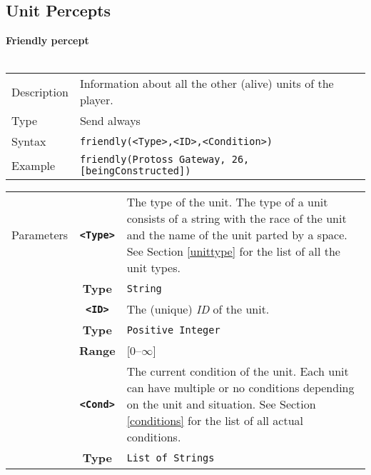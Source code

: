 \subsection{Unit Percepts}
\noindent
\textbf{Friendly percept}\\
\\
\begin{tabularx}{\textwidth}{lX}
 Description & Information about all the other (alive) units of the player. \\
 Type & Send always \\
 Syntax & \verb|friendly(<Type>,<ID>,<Condition>)| \\
 Example & \verb|friendly(Protoss Gateway, 26, [beingConstructed])| \\
 \end{tabularx}
 \begin{tabularx}{\textwidth}{l | c | p{8cm}|}
 \cline{2-3}
 Parameters
            & \textbf{\verb|<Type>|} & The type of the unit. The type of a unit consists of a string with the race of the unit and the name of the unit parted by a space. See Section \ref{unittype} for the list of all the unit types. \\
            & \textbf{Type} & \verb|String| \\
            \cline{2-3}
            & \textbf{\verb|<ID>|} & The (unique) \textit{ID} of the unit.\\
            & \textbf{Type} & \verb|Positive Integer| \\
            & \textbf{Range} & [0--$\infty$] \\
            \cline{2-3}
            & \textbf{\verb|<Cond>|} & The current condition of the unit. Each unit can have multiple or no conditions depending on the unit and situation. See Section \ref{conditions} for the list of all actual conditions.\\
            & \textbf{Type} & \verb|List of Strings| \\
            \cline{2-3}
\end{tabularx}\\
\newpage
\noindent

